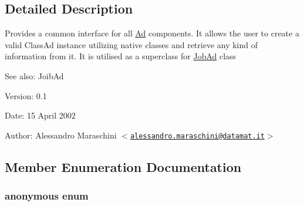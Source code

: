 \subsection{Detailed Description}
Provides a common interface for all \hyperlink{classglite_1_1wms_1_1jdl_1_1Ad}{Ad} components. It allows the user to create a valid Class\-Ad instance utilizing native classes and retrieve any kind of information from it. It is utilised as a superclass for \hyperlink{classglite_1_1wms_1_1jdl_1_1JobAd}{Job\-Ad} class \begin{Desc}
\item[See also:]Joib\-Ad\end{Desc}
\begin{Desc}
\item[Version:]0.1 \end{Desc}
\begin{Desc}
\item[Date:]15 April 2002 \end{Desc}
\begin{Desc}
\item[Author:]Alessandro Maraschini $<$\href{mailto:alessandro.maraschini@datamat.it}{\tt alessandro.maraschini@datamat.it}$>$ \end{Desc}




\subsection{Member Enumeration Documentation}
\hypertarget{classglite_1_1wms_1_1jdl_1_1Ad_z19_0}{
\subsubsection["@0]{\setlength{\rightskip}{0pt plus 5cm}anonymous enum}}
\label{classglite_1_1wms_1_1jdl_1_1Ad_z19_0}


